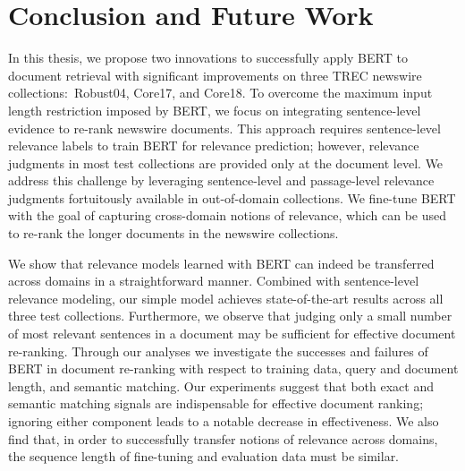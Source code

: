 \chapter{Conclusion and Future Work}
\label{ch:conclusion}

In this thesis, we propose two innovations to successfully apply BERT to document retrieval with significant improvements on three TREC newswire collections:\ Robust04, Core17, and Core18.
To overcome the maximum input length restriction imposed by BERT, we focus on integrating sentence-level evidence to re-rank newswire documents.
This approach requires sentence-level relevance labels to train BERT for relevance prediction; however, relevance judgments in most test collections are provided only at the document level.
We address this challenge by leveraging sentence-level and passage-level relevance judgments fortuitously available in out-of-domain collections.
We fine-tune BERT with the goal of capturing cross-domain notions of relevance, which can be used to re-rank the longer documents in the newswire collections.

We show that relevance models learned with BERT can indeed be transferred across domains in a straightforward manner.
Combined with sentence-level relevance modeling, our simple model achieves state-of-the-art results across all three test collections.
Furthermore, we observe that judging only a small number of most relevant sentences in a document may be sufficient for effective document re-ranking.
Through our analyses we investigate the successes and failures of BERT in document re-ranking with respect to training data, query and document length, and semantic matching.
Our experiments suggest that both exact and semantic matching signals are indispensable for effective document ranking; ignoring either component leads to a notable decrease in effectiveness.
We also find that, in order to successfully transfer notions of relevance across domains, the sequence length of fine-tuning and evaluation data must be similar.

